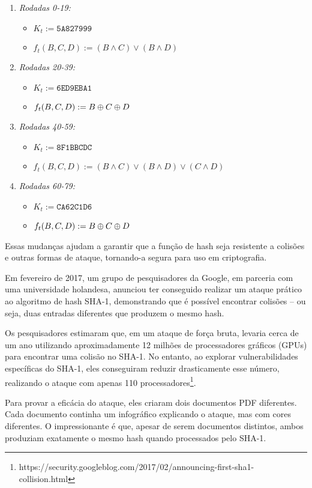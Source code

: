 \begin{enumerate}
\item {\em Rodadas 0-19:}
  \begin{itemize}
  \item $K_t := \texttt{5A827999}$
  \item $f_t(B,C,D) := (B \land C) \lor (B \land D)$
  \end{itemize}
\item {\em Rodadas 20-39:}
  \begin{itemize}
  \item $K_t := \texttt{6ED9EBA1}$
  \item $f_t(B,C,D) := B \oplus C \oplus D$
  \end{itemize}
\item {\em Rodadas 40-59:}
  \begin{itemize}
  \item $K_t := \texttt{8F1BBCDC}$
  \item $f_t(B,C,D) := (B \land C) \lor (B \land D) \lor (C \land D)$
  \end{itemize}
\item {\em Rodadas 60-79:}
  \begin{itemize}
  \item $K_t := \texttt{CA62C1D6}$
  \item $f_t(B,C,D) := B \oplus C \oplus D$
  \end{itemize}
\end{enumerate}

Essas mudanças ajudam a garantir que a função de hash seja resistente a colisões e outras formas de ataque, tornando-a segura para uso em criptografia.

Em fevereiro de 2017, um grupo de pesquisadores da Google, em parceria com uma universidade holandesa, anunciou ter conseguido realizar um ataque prático ao algoritmo de hash SHA-1, demonstrando que é possível encontrar colisões -- ou seja, duas entradas diferentes que produzem o mesmo hash.

Os pesquisadores estimaram que, em um ataque de força bruta, levaria cerca de um ano utilizando aproximadamente 12 milhões de processadores gráficos (GPUs) para encontrar uma colisão no SHA-1.
No entanto, ao explorar vulnerabilidades específicas do SHA-1, eles conseguiram reduzir drasticamente esse número, realizando o ataque com apenas 110 processadores\footnote{https://security.googleblog.com/2017/02/announcing-first-sha1-collision.html}.

Para provar a eficácia do ataque, eles criaram dois documentos PDF diferentes.
Cada documento continha um infográfico explicando o ataque, mas com cores diferentes.
O impressionante é que, apesar de serem documentos distintos, ambos produziam exatamente o mesmo hash quando processados pelo SHA-1.

